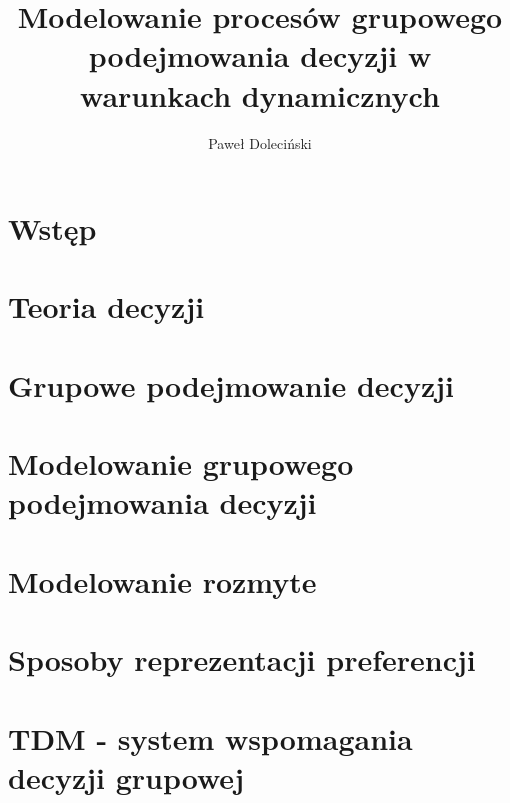 \documentclass[12pt,oneside]{memoir}
\title{Modelowanie procesów grupowego podejmowania decyzji w warunkach dynamicznych}
\author{Paweł Doleciński}
\begin{document}
    \renewcommand{\figurename}{Rys.}    %
    \renewcommand{\tablename}{Tab.}     %
    \thispagestyle{empty}               %
    
    \stronatytulowa  

	
    \newpage

	\hypersetup{linkcolor=black}

    \tableofcontents*
	\newpage

	\chapter*{Wstęp}
	

	\chapter{Teoria decyzji}
  	
	
	\chapter{Grupowe podejmowanie decyzji}
	
	
	\chapter{Modelowanie grupowego podejmowania decyzji}
	
	
	\chapter{Modelowanie rozmyte}
	
	
	\chapter{Sposoby reprezentacji preferencji}
	
	
	\chapter{TDM - system wspomagania decyzji grupowej}
	
	
\end{document}
